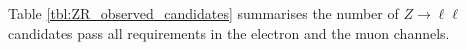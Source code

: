 Table \ref{tbl:ZR_observed_candidates} summarises the number of $Z \rightarrow \ell \ell$  candidates pass all requirements in the electron and the muon channels.




